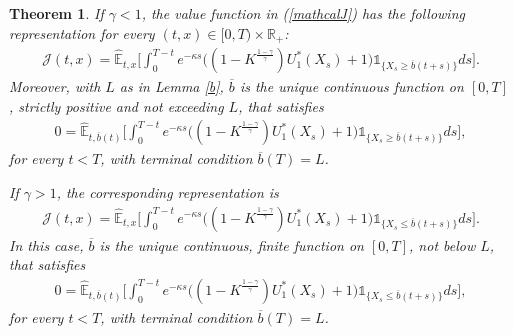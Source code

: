 \documentclass[a4paper,11pt]{amsart}
\numberwithin{equation}{section}
\newtheorem{theorem}{Theorem}[section]
\begin{document}
{{{\color{black}
\begin{theorem}\label{integral}
If $\gamma<1$, the value function in (\ref{mathcalJ}) has the following representation for every $(t,x)\in[0,T)\times\mathbb R_+$:
\begin{align*}
\mathcal J(t,x)=\widehat{\mathbb E}_{t,x}\bigg[\int_0^{T-t}e^{-\kappa s}\Big((1-K^{\frac{1-\gamma}{\gamma}})U_1^\ast(X_s)+1\Big)\mathds{1}_{\{X_s\geq\overline b(t+s)\}}ds\bigg].\tag{\theequation}\label{integralJ1}
\end{align*}
Moreover, with $L$ as in Lemma \ref{b}, $\overline b$ is the unique continuous function on $[0,T]$, strictly positive and not exceeding $L$, that satisfies
\begin{align*}
0=\widehat{\mathbb E}_{t,\overline b(t)}\bigg[\int_0^{T-t}e^{-\kappa s}\Big((1-K^{\frac{1-\gamma}{\gamma}})U_1^\ast(X_s)+1\Big)\mathds{1}_{\{X_s\geq\overline b(t+s)\}}ds\bigg],\tag{\theequation}\label{integralb1}
\end{align*}
for every $t<T$, with terminal condition $\overline b(T)=L$.

If $\gamma>1$, the corresponding representation is
\begin{align*}
\mathcal J(t,x)=\widehat{\mathbb E}_{t,x}\bigg[\int_0^{T-t}e^{-\kappa s}\Big((1-K^{\frac{1-\gamma}{\gamma}})U_1^\ast(X_s)+1\Big)\mathds{1}_{\{X_s\leq\overline b(t+s)\}}ds\bigg].\tag{\theequation}\label{integralJ2}
\end{align*}
In this case, $\overline b$ is the unique continuous, finite function on $[0,T]$, not below $L$, that satisfies
\begin{align*}
0=\widehat{\mathbb E}_{t,\overline b(t)}\bigg[\int_0^{T-t}e^{-\kappa s}\Big((1-K^{\frac{1-\gamma}{\gamma}})U_1^\ast(X_s)+1\Big)\mathds{1}_{\{X_s\leq\overline b(t+s)\}}ds\bigg],\tag{\theequation}\label{integralb2}
\end{align*}
for every $t<T$, with terminal condition $\overline b(T)=L$.
\end{theorem}

}}}
\end{document}
